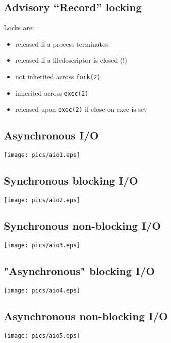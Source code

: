 \documentclass[xga]{xdvislides}
\begin{document}
\subsection{Advisory ``Record'' locking}
Locks are:
\begin{itemize}
	\item released if a process terminates
	\item released if a filedescriptor is closed (!)
	\item not inherited across {\tt fork(2)}
	\item inherited across {\tt exec(2)}
	\item released upon {\tt exec(2)} if close-on-exec is set
\end{itemize}

\subsection{Asynchronous I/O}
\begin{center}
\texttt{[image: pics/aio1.eps]}
\end{center}

\subsection{Synchronous blocking I/O}
\begin{center}
\texttt{[image: pics/aio2.eps]}
\end{center}

\subsection{Synchronous non-blocking I/O}
\begin{center}
\texttt{[image: pics/aio3.eps]}
\end{center}

\subsection{"Asynchronous" blocking I/O}
\begin{center}
\texttt{[image: pics/aio4.eps]}
\end{center}

\subsection{Asynchronous non-blocking I/O}
\begin{center}
\texttt{[image: pics/aio5.eps]}
\end{center}
\end{document}
